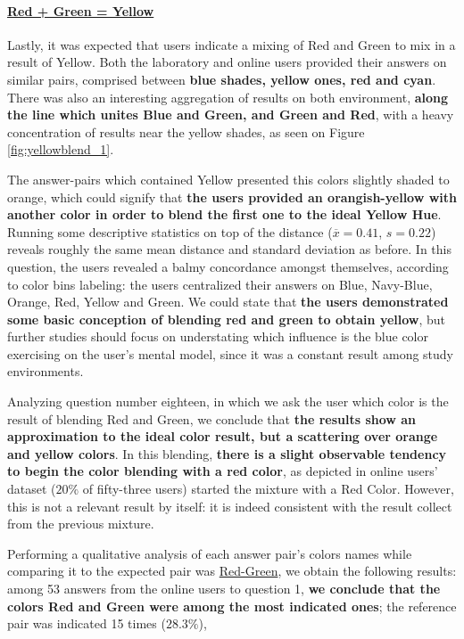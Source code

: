 \paragraph{\ul{Red + Green = Yellow}}
%
Lastly, it was expected that users indicate a mixing of Red and Green to mix in a result of Yellow. Both the laboratory and online users provided their answers on similar pairs, comprised between \textbf{blue shades, yellow ones, red and cyan}. There was also an
interesting aggregation of results on both environment, \textbf{along the line which unites Blue and Green, and Green and Red}, with a heavy concentration of results near the yellow shades, as seen on Figure \ref{fig:yellowblend_1}. \par
%
The answer-pairs which contained Yellow presented this colors slightly shaded to orange, which could signify that \textbf{the users provided an orangish-yellow with another color in order to blend the first one to the ideal Yellow Hue}. \\
%
Running some descriptive statistics on top of the distance ($\overline{x} = 0.41$, $s = 0.22$) reveals roughly the same mean distance and standard deviation as before. In this question, the users revealed a balmy concordance amongst themselves, according to color bins
labeling: the users centralized their answers on Blue, Navy-Blue, Orange, Red, Yellow and Green. We could state that \textbf{the users demonstrated some basic conception of blending red and green to obtain yellow}, but further studies should focus on understating which
influence is the blue color exercising on the user's mental model, since it was a constant result among study environments. \par
%
Analyzing question number eighteen, in which we ask the user which color is the result of blending Red and Green, we conclude that \textbf{the results show an approximation to the ideal color result, but a scattering over orange and yellow colors}.
In this blending, \textbf{there is a slight observable tendency to begin the color blending with a red color}, as depicted in online users' dataset ($20\%$ of fifty-three users) started the mixture with a Red Color. However, this is not a relevant result by itself: it is
indeed consistent with the result collect from the previous mixture. \par
%
Performing a qualitative analysis of each answer pair's colors names while comparing it to the expected pair was
\ul{Red-Green}, we obtain the following results: among 53 answers from the online users to question 1, \textbf{we conclude
that the colors Red and Green were among the most indicated ones}; the reference pair was indicated 15 times ($28.3\%$),
